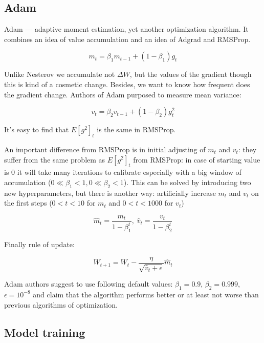 \subsection{Adam}

Adam — adaptive moment estimation, yet another optimization algorithm. It combines an idea of value accumulation and an idea of Adgrad and RMSProp.

\begin{equation}
    m_t = \beta_1 m_{t-1} + (1 - \beta_1) g_t
\end{equation}

Unlike Nesterov we accumulate not $\Delta W$, but the values of the gradient though this is kind of a cosmetic change. Besides, we want to know how frequent does the gradient change. Authors of Adam purposed to measure mean variance:


\begin{equation}
    v_t = \beta_2 v_{t-1} + (1 - \beta_2) g_t^2
\end{equation}

It's easy to find that $E[g^2]_t$ is the same in RMSProp.

An important difference from RMSProp is in initial adjusting of $m_t$ and $v_t$: they suffer from the same problem as $E[g^2]_t$ from RMSProp: in case of starting value is $0$ it will take many iterations to calibrate especially with a big window of accumulation ($0 \ll \beta_1 < 1, 0 \ll \beta_2 < 1$). This can be solved by introducing two new hyperparameters, but there is another way: artificially increase $m_t$ and $v_t$ on the first steps ($0 < t < 10$ for $m_t$ and $0 < t < 1000$ for $v_t$)

\begin{equation}
    \hat{m}_t = \frac{m_t}{1 - \beta^t_1}, \;
    \hat{v}_t = \frac{v_t}{1 - \beta^t_2}
\end{equation}

Finally rule of update:

\begin{equation}
    W_{t+1} = W_{t} - \dfrac{\eta}{\sqrt{\hat{v}_t + \epsilon}} \hat{m}_t
\end{equation}

Adam authors suggest to use following default values: $\beta_1 = 0.9$, $\beta_2 = 0.999$, $\epsilon = 10^{-8}$ and claim that the algorithm performs better or at least not worse than previous algorithms of optimization.

\subsection{Model training}

